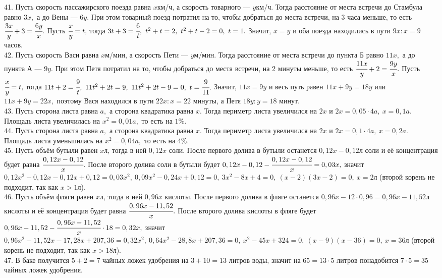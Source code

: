 \documentclass[12pt]{article}
\begin{document}
41. Пусть скорость пассажирского поезда равна $x$км/ч, а скорость товарного --- $y$км/ч. Тогда расстояние от места встречи до Стамбула равно $3x,$ а до Вены --- $6y.$ При этом товарный поезд потратил на то, чтобы добраться до места встречи, на 3 часа меньше, то есть $\cfrac{3x}{y}+3=\cfrac{6y}{x}.$ Пусть $\cfrac{x}{y}=t,$ тогда $3t+3=\cfrac{6}{t},\ t^2+t=2,\ t^2+t-2=0,\ t=1.$ Значит, $x=y$ и оба поезда находились в пути $9x:x=9$ часов.\\
42. Пусть скорость Васи равна $x$м/мин, а скорость Пети --- $y$м/мин. Тогда расстояние от места встречи до пункта Б равно $11x,$ а до пункта А --- $9y.$ При этом Петя потратил на то, чтобы добраться до места встречи, на 2 минуты меньше, то есть $\cfrac{11x}{y}+2=\cfrac{9y}{x}.$ Пусть $\cfrac{x}{y}=t,$ тогда $11t+2=\cfrac{9}{t},\ 11t^2+2t=9,\ 11t^2+2t-9=0,\ t=\cfrac{9}{11}.$ Значит, $11x=9y$ и весь путь равен $11x+9y=18y$ или $11x+9y=22x,$ поэтому Вася находился в пути $22x:x=22$ минуты, а Петя $18y:y=18$ минут.\\
43. Пусть сторона листа равна $a,$ а сторона квадратика равна $x.$ Тогда периметр листа увеличился на $2x$ и $2x=0,05\cdot4a,\ x=0,1a.$ Площадь листа увеличилась на $x^2=0,01a,$ то есть на $1\%.$\\
44. Пусть сторона листа равна $a,$ а сторона квадратика равна $x.$ Тогда периметр листа увеличился на $2x$ и $2x=0,1\cdot4a,\ x=0,2a.$ Площадь листа уменьшилась на $x^2=0,04a,$ то есть на $4\%.$\\
45. Пусть объём бутыли равен $x$л, тогда в ней $0,12x$ соли. После первого долива в бутыли останется $0,12x-0,12$л соли и её концентрация будет равна $\cfrac{0,12x-0,12}{x}.$ После второго долива соли в бутыли будет $0,12x-0,12-\cfrac{0,12x-0,12}{x}=0,03x,$ значит $0,12x^2-0,12x-0,12x+0,12=0,03x^2,\ 0,09x^2-0,24x+0,12=0,\ 3x^2-8x+4=0,\ (x-2)(3x-2)=0,\ x=2$л (второй корень не подходит, так как $x>1$л).\\
46. Пусть объём фляги равен $x$л, тогда в ней $0,96x$ кислоты. После первого долива в фляге останется $0,96x-12\cdot0,96=0,96x-11,52$л кислоты и её концентрация будет равна $\cfrac{0,96x-11,52}{x}.$ После второго долива кислоты в фляге будет $0,96x-11,52-\cfrac{0,96x-11,52}{x}\cdot18=0,32x,$ значит $0,96x^2-11,52x-17,28x+207,36=0,32x^2,\ 0,64x^2-28,8x+207,36=0,\ x^2-45x+324=0,\ (x-9)(x-36)=0,\ x=36$л (второй корень не подходит, так как $x>18$л).\\
47. В баке получится $5+2=7$ чайных ложек удобрения на $3+10=13$ литров воды, значит на $65=13\cdot5$ литров понадобится $7\cdot5=35$ чайных ложек удобрения.\\
\end{document}

